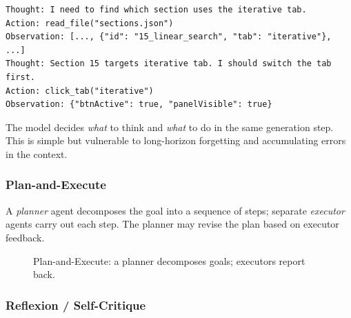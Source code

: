 \documentclass[12pt,a4paper]{article}
\begin{document}
\begin{lstlisting}[language={},caption=ReAct trace fragment]
Thought: I need to find which section uses the iterative tab.
Action: read_file("sections.json")
Observation: [..., {"id": "15_linear_search", "tab": "iterative"}, ...]
Thought: Section 15 targets iterative tab. I should switch the tab first.
Action: click_tab("iterative")
Observation: {"btnActive": true, "panelVisible": true}
\end{lstlisting}

The model decides \emph{what} to think and \emph{what} to do in the same
generation step. This is simple but vulnerable to long-horizon forgetting and
accumulating errors in the context.

\subsubsection{Plan-and-Execute}

A \emph{planner} agent decomposes the goal into a sequence of steps; separate
\emph{executor} agents carry out each step. The planner may revise the plan
based on executor feedback.

\begin{figure}[h]
\centering
{}
\caption{Plan-and-Execute: a planner decomposes goals; executors report back.}
\label{fig:planexec}
\end{figure}

\subsubsection{Reflexion / Self-Critique}
\end{document}
